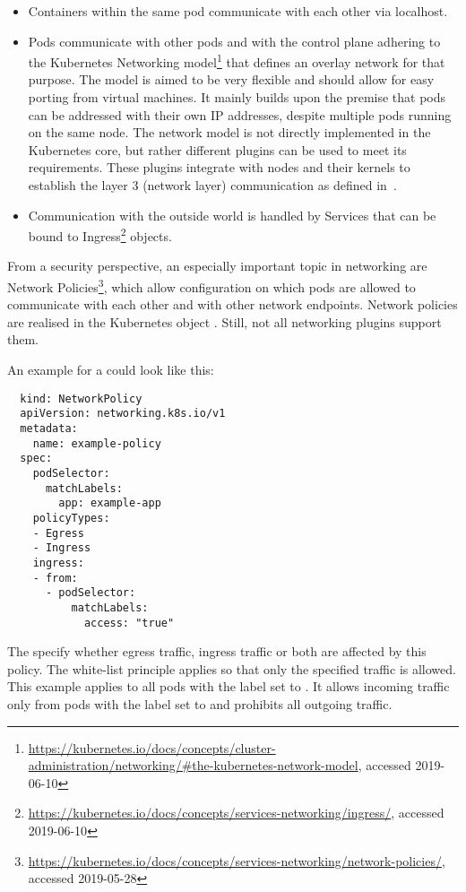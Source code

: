 \begin{itemize}
    \item Containers within the same pod communicate with each other via localhost.
    \item Pods communicate with other pods and with the control plane adhering to the Kubernetes Networking model\footnote{\url{https://kubernetes.io/docs/concepts/cluster-administration/networking/\#the-kubernetes-network-model}, accessed 2019-06-10} that defines an overlay network for that purpose. The model is aimed to be very flexible and should allow for easy porting from virtual machines. It mainly builds upon the premise that pods can be addressed with their own IP addresses, despite multiple pods running on the same node. The network model is not directly implemented in the Kubernetes core, but rather different plugins can be used to meet its requirements. These plugins integrate with nodes and their kernels to establish the layer 3 (network layer) communication as defined in~\textcite{osiModel}.
    \item Communication with the outside world is handled by Services that can be bound to  Ingress\footnote{\url{https://kubernetes.io/docs/concepts/services-networking/ingress/}, accessed 2019-06-10} objects.
\end{itemize}

From a security perspective, an especially important topic in networking are Network Policies\footnote{\url{https://kubernetes.io/docs/concepts/services-networking/network-policies/}, accessed 2019-05-28}, which allow configuration on which pods are allowed to communicate with each other and with other network endpoints. Network policies are realised in the Kubernetes object . Still, not all networking plugins support them.

An example for a  could look like this:

\begin{verbatim}
  kind: NetworkPolicy
  apiVersion: networking.k8s.io/v1
  metadata:
    name: example-policy
  spec:
    podSelector:
      matchLabels:
        app: example-app
    policyTypes:
    - Egress
    - Ingress
    ingress:
    - from:
      - podSelector:
          matchLabels:
            access: "true"
\end{verbatim}

The  specify whether egress traffic, ingress traffic or both are affected by this policy. The white-list principle applies so that only the specified traffic is allowed. This example applies to all pods with the label  set to . It allows incoming traffic only from pods with the label  set to  and prohibits all outgoing traffic.

